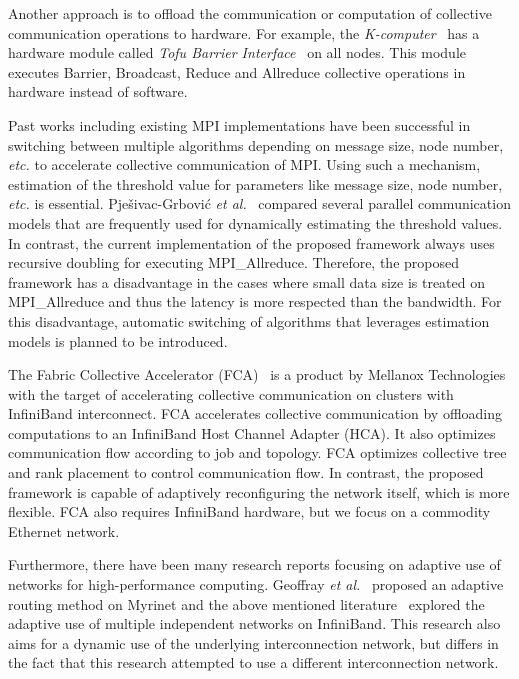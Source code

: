 Another approach is to offload the communication or computation of collective
communication operations to hardware. For example, the
\emph{K-computer}~\autocite{Yokokawa2011} has a hardware module called
\emph{Tofu Barrier Interface}~\autocite{Ajima2012} on all nodes. This module
executes Barrier, Broadcast, Reduce and Allreduce collective operations in
hardware instead of software.

Past works including existing MPI implementations have been successful
in switching between multiple algorithms depending on message size, node
number, \emph{etc.} to accelerate collective communication of MPI\@. Using
such a mechanism, estimation of the threshold value for parameters like
message size, node number, \emph{etc.} is essential. Pje\v{s}ivac-Grbovi\'{c}
\emph{et al.}~\autocite{PjesivacGrbovic2007} compared several parallel
communication models that are frequently used for dynamically estimating the
threshold values. In contrast, the current implementation of the proposed
framework always uses recursive doubling for executing MPI\_Allreduce.
Therefore, the proposed framework has a disadvantage in the cases where small
data size is treated on MPI\_Allreduce and thus the latency is more respected
than the bandwidth. For this disadvantage, automatic switching of algorithms
that leverages estimation models is planned to be introduced.

The Fabric Collective Accelerator (FCA)~\autocite{fca} is a product by
Mellanox Technologies with the target of accelerating collective
communication on clusters with InfiniBand interconnect. FCA accelerates
collective communication by offloading computations to an InfiniBand
Host Channel Adapter (HCA). It also optimizes communication flow
according to job and topology. FCA optimizes collective tree and rank
placement to control communication flow. In contrast, the proposed
framework is capable of adaptively reconfiguring the network itself,
which is more flexible. FCA also requires InfiniBand hardware, but we
focus on a commodity Ethernet network.

Furthermore, there have been many research reports focusing on adaptive
use of networks for high-performance computing. Geoffray \emph{et
al.}~\autocite{Geoffray2008} proposed an adaptive routing method on Myrinet
and the above mentioned literature~\autocite{Jiuxing2004} explored the
adaptive use of multiple independent networks on InfiniBand. This research also
aims for a dynamic use of the underlying interconnection network, but differs
in the fact that this research attempted to use a different interconnection
network.

